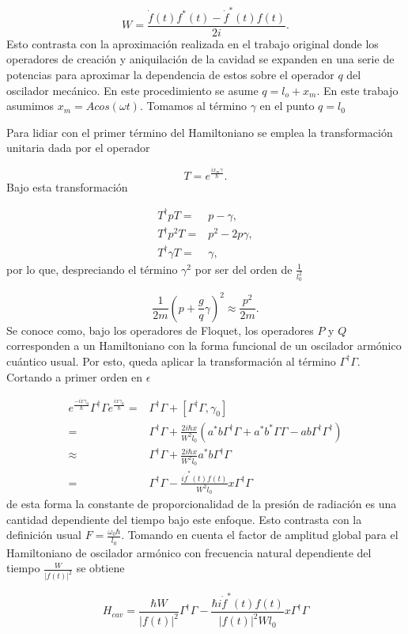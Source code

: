 \documentclass[10pt,a4paper]{report}
\begin{document}
\begin{equation}
W= \frac{\dot{f}(t)f^*(t)-\dot{f}^*(t)f(t)}{2i}.
\end{equation}  Esto contrasta con la aproximación realizada en el trabajo original donde los operadores de creación y aniquilación de la cavidad se expanden en una serie de potencias para aproximar la dependencia de estos sobre el operador $q$ del oscilador mecánico. En este procedimiento se asume $q = l_o + x_m$. En este trabajo asumimos $x_m = Acos(\omega t)$. Tomamos al término $\gamma$ en el punto $q=l_0$

Para lidiar con el primer término del Hamiltoniano se emplea la transformación unitaria dada por el operador

\begin{equation}
T = e^\frac{i x_m \gamma}{\hbar}.
\end{equation} Bajo esta transformación 

\begin{align*}
T^\dagger p T =& p - \gamma, \\
T^\dagger p^2 T =& p^2 -2p\gamma, \\
T^\dagger \gamma T =& \gamma,
\end{align*} por lo que, despreciando el término $\gamma^2$ por ser del orden de $\frac{1}{l_0^2}$

\begin{equation}
\frac{1}{2m}(p + \frac{g}{q} \gamma)^2 \approx \frac{p^2}{2m}.
\end{equation} Se conoce como, bajo los operadores de Floquet, los operadores $P$ y $Q$ corresponden a un Hamiltoniano con la forma funcional de un oscilador armónico cuántico usual. Por esto, queda aplicar la transformación al término $\Gamma^\dagger \Gamma$. Cortando a primer orden en $\epsilon$

\begin{align*}
e^{\frac{-ix\gamma_0}{\hbar}}\Gamma^\dagger \Gamma e^{\frac{ix\gamma_0}{\hbar}} =& \Gamma^\dagger \Gamma + [\Gamma^\dagger \Gamma, \gamma_0] \\
=& \Gamma^\dagger \Gamma + \frac{2i\hbar x}{W^2 l_0}(a^*b \Gamma^\dagger \Gamma + a^*b^* \Gamma \Gamma -ab\Gamma^\dagger \Gamma^\dagger)\\
\approx & \Gamma^\dagger \Gamma + \frac{2i\hbar x}{W^2 l_0} a^*b \Gamma^\dagger \Gamma \\
=& \Gamma^\dagger \Gamma - \frac{i \dot{f}^*(t)f(t) }{W^2 l_0} x  \Gamma^\dagger \Gamma
\end{align*} de esta forma la constante de proporcionalidad de la presión de radiación es una cantidad dependiente del tiempo bajo este enfoque. Esto contrasta con la definición usual $F= \frac{\omega_0 \hbar}{l_0}$. Tomando en cuenta el factor de amplitud global para el Hamiltoniano de oscilador armónico con frecuencia natural dependiente del tiempo $\frac{W}{|f(t)|^2}$ se obtiene

\begin{equation}
H_{cav} = \frac{\hbar W}{|f(t)|^2}\Gamma^\dagger \Gamma - \frac{\hbar i\dot{f}^*(t)f(t) }{|f(t)|^2W l_0}x  \Gamma^ \dagger \Gamma
\end{equation}






\end{document}
